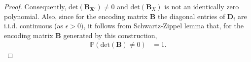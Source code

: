 \documentclass[journal,draftcls,onecolumn]{IEEEtran}
\theoremstyle{mystyle}
\newcommand{\bfC}{\mathbf{C}}
\newcommand{\bfD}{\mathbf{D}}
\newcommand{\bfX}{\mathbf{X}}
\newcommand{\bfB}{\mathbf{B}}
\begin{document}
\begin{proof}




Consequently, $\text{det}(\mathbf{B}_{\bfX'}) \ne 0$ and  $\text{det}(\bfB_X)$ is not an identically zero polynomial. Also, since for the encoding matrix $\bfB$ the diagonal entries of $\bfD_i$ are i.i.d. continuous (as $\epsilon > 0)$, it follows from Schwartz-Zippel lemma \cite{zippel1979probabilistic} that, for the encoding matrix $\mathbf{B}$ generated by this construction, 
\begin{align*}
\mathbb{P}(\text{det}(\mathbf{B}) \ne 0) &= 1.
\end{align*} 




\end{proof}
\end{document}

